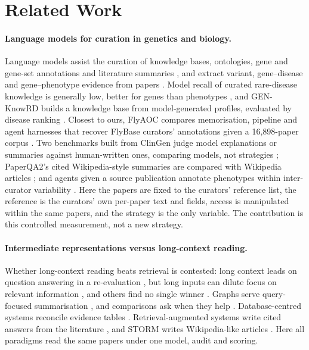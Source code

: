 \documentclass{article} %
\begin{document}
\section{Related Work}
\label{sec:related_work}
\paragraph{Language models for curation in genetics and biology.}
Language models assist the curation of knowledge bases, ontologies, gene and gene-set annotations and literature summaries \citep{caufield2024structured,caufield2024curategpt,toro2024dynamic,Li2025GenewhispererEnhancing,hu2025evaluation,niyonkuru2025leveraging,Green2026GoflowllmcuratingMirna,Murphy2024HarnessingGenerative,Green2023LitsummLarge}, and extract variant, gene--disease and gene--phenotype evidence from papers \citep{li2025autopm3,furlan2025eagleai,wang2026pubmind,yin2026benchmarking,twede2026evidence}. Model recall of curated rare-disease knowledge is generally low, better for genes than phenotypes \citep{groza2026systematic}, and GEN-KnowRD builds a knowledge base from model-generated profiles, evaluated by disease ranking \citep{yan2026genknowrd}. Closest to ours, FlyAOC compares memorisation, pipeline and agent harnesses that recover FlyBase curators' annotations given a 16,898-paper corpus \citep{zhang2026flyaoc}. Two benchmarks built from ClinGen judge model explanations or summaries against human-written ones, comparing models, not strategies \citep{queen2025cgbench,Saadat2026LargeLanguage}; PaperQA2's cited Wikipedia-style summaries are compared with Wikipedia articles \citep{skarlinski2024language}; and agents given a source publication annotate phenotypes within inter-curator variability \citep{balhoff2026frontier}. Here the papers are fixed to the curators' reference list, the reference is the curators' own per-paper text and fields, access is manipulated within the same papers, and the strategy is the only variable. The contribution is this controlled measurement, not a new strategy.

\paragraph{Intermediate representations versus long-context reading.}
Whether long-context reading beats retrieval is contested: long context leads on question answering in a re-evaluation \citep{Li2024LongContext}, but long inputs can dilute focus on relevant information \citep{Yu2024DefenseRag,liu2024lost,Zhang2024ChainAgents}, and others find no single winner \citep{Li2025LaraBenchmarking}. Graphs serve query-focused summarisation \citep{edge2024local}, and comparisons ask when they help \citep{han2025rag,xiang2025use}. Database-centred systems reconcile evidence tables \citep{joshi2026sliders}. Retrieval-augmented systems write cited answers from the literature \citep{Lla2023PaperqaRetrievalaugmented,Asai2024OpenscholarSynthesizing,singh2025ai2}, and STORM writes Wikipedia-like articles \citep{shao2024assisting}. Here all paradigms read the same papers under one model, audit and scoring.
\end{document}
